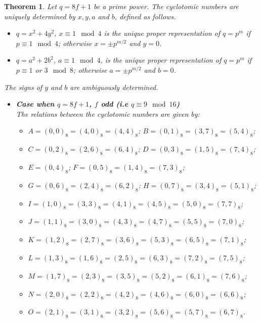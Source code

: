 \documentclass[10pt,a4paper]{amsart}
\newtheorem{theorem}{Theorem}
\begin{document}
\begin{theorem}\label{thm:e=8cyclo}
Let $q=8f+1$ be a prime power.  The cyclotomic numbers are uniquely determined by $x,y,a$ and $b$, defined as follows.
\begin{itemize}
    \item $q=x^2+4y^2$, $x \equiv 1 \mod 4$ is the unique proper representation of $q=p^m$ if $p \equiv 1 \mod 4$; otherwise $x=\pm p^{m/2}$ and $y=0$.
    \item $q=a^2+2b^2$, $a \equiv 1 \mod 4$, is the unique proper representation of $q=p^m$ if $p \equiv 1$ or $3 \mod 8$; otherwise $a= \pm p^{m/2}$ and $b=0$. 
\end{itemize}
The signs of $y$ and $b$ are ambiguously determined.

\begin{itemize}
\item[]{\bf Case when $q=8f+1$, $f$ odd (i.e $q \equiv 9 \mod 16$)}\\
The relations between the cyclotomic numbers are given by:
\begin{itemize}
\item[]$A=(0,0)_8 =(4,0)_8 =(4,4)_8$; $B=(0,1)_8 =(3,7)_8 =(5,4)_8$;
\item[]$C=(0,2)_8 =(2,6)_8 =(6,4)_8$; $D=(0,3)_8 =(1,5)_8 =(7,4)_8$; 
\item[]$E=(0,4)_8$; $F=(0,5)_8 =(1,4)_8 =(7,3)_8$; 
\item[]$G=(0,6)_8 =(2,4)_8 =(6,2)_8$; $H=(0,7)_8 =(3,4)_8 =(5,1)_8$;
\item[]$I=(1,0)_8 =(3,3)_8 =(4,1)_8 =(4,5)_8 =(5,0)_8 =(7,7)_8$;
\item[]$J=(1,1)_8 =(3,0)_8 =(4,3)_8 =(4,7)_8 =(5,5)_8 =(7,0)_8$;
\item[]$K=(1,2)_8 =(2,7)_8 =(3,6)_8 =(5,3)_8 =(6,5)_8 =(7,1)_8$;
\item[]$L=(1,3)_8 =(1,6)_8 =(2,5)_8 =(6,3)_8 =(7,2)_8 =(7,5)_8$;
\item[]$M=(1,7)_8 =(2,3)_8 =(3,5)_8 =(5,2)_8 =(6,1)_8 =(7,6)_8$;
\item[]$N=(2,0)_8 =(2,2)_8 =(4,2)_8 =(4,6)_8 =(6,0)_8 =(6,6)_8$;
\item[]$O=(2,1)_8 =(3,1)_8 =(3,2)_8 =(5,6)_8 =(5,7)_8 =(6,7)_8$.
\end{itemize}


\end{itemize}
\end{theorem}
\end{document}
